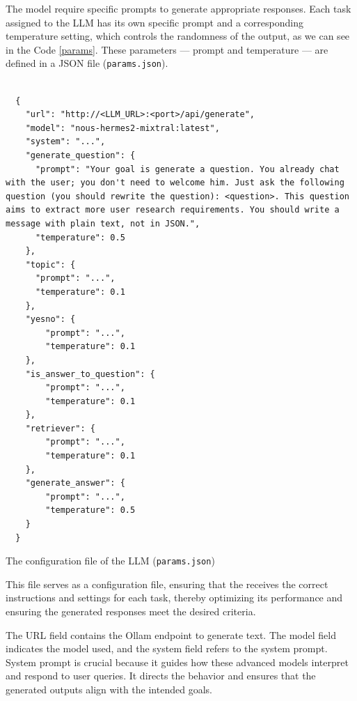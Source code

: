
The model require specific prompts to generate appropriate responses. Each task assigned to the LLM has its own specific prompt and a corresponding temperature setting, which controls the randomness of the output, as we can see in the Code \ref{params}. These parameters — prompt and temperature — are defined in a JSON file {\small\normalfont(\texttt{params.json})}. 

\begin{listing}[H]
  \begin{verbatim}
      
  {
    "url": "http://<LLM_URL>:<port>/api/generate",
    "model": "nous-hermes2-mixtral:latest",
    "system": "...",
    "generate_question": {
      "prompt": "Your goal is generate a question. You already chat with the user; you don't need to welcome him. Just ask the following question (you should rewrite the question): <question>. This question aims to extract more user research requirements. You should write a message with plain text, not in JSON.",
      "temperature": 0.5
    },
    "topic": {
      "prompt": "...",
      "temperature": 0.1
    },
    "yesno": {
        "prompt": "...",
        "temperature": 0.1
    },
    "is_answer_to_question": {
        "prompt": "...",
        "temperature": 0.1
    },
    "retriever": {
        "prompt": "...",
        "temperature": 0.1
    },
    "generate_answer": {
        "prompt": "...",
        "temperature": 0.5
    }
  }
  \end{verbatim}
  \caption{The configuration file of the LLM {\small\normalfont(\texttt{params.json})}}
  \label{params}
\end{listing}

This file serves as a configuration file, ensuring that the {\llm} receives the correct instructions and settings for each task, thereby optimizing its performance and ensuring the generated responses meet the desired criteria.

The URL field contains the Ollam {\llm} endpoint to generate text. The model field indicates the {\llm} model used, and the system field refers to the system prompt. System prompt is crucial because it guides how these advanced {\ai} models interpret and respond to user queries. It directs the {\llm} behavior and ensures that the generated outputs align with the intended goals. 

